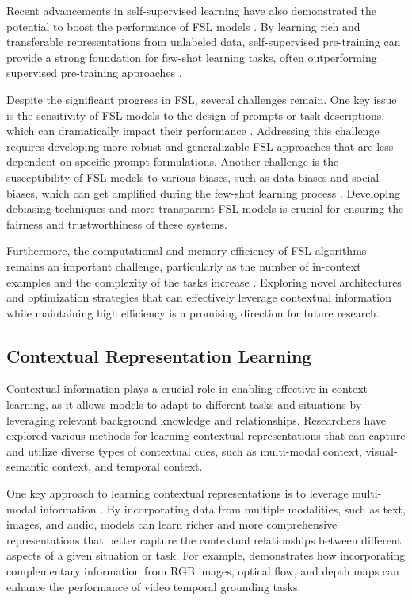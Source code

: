 \documentclass[11pt]{article}
\begin{document}
Recent advancements in self-supervised learning have also demonstrated the potential to boost the performance of FSL models \cite{ref117,ref118}. By learning rich and transferable representations from unlabeled data, self-supervised pre-training can provide a strong foundation for few-shot learning tasks, often outperforming supervised pre-training approaches \cite{ref119}.

Despite the significant progress in FSL, several challenges remain. One key issue is the sensitivity of FSL models to the design of prompts or task descriptions, which can dramatically impact their performance \cite{ref51}. Addressing this challenge requires developing more robust and generalizable FSL approaches that are less dependent on specific prompt formulations. Another challenge is the susceptibility of FSL models to various biases, such as data biases and social biases, which can get amplified during the few-shot learning process \cite{ref94}. Developing debiasing techniques and more transparent FSL models is crucial for ensuring the fairness and trustworthiness of these systems.

Furthermore, the computational and memory efficiency of FSL algorithms remains an important challenge, particularly as the number of in-context examples and the complexity of the tasks increase \cite{ref120}. Exploring novel architectures and optimization strategies that can effectively leverage contextual information while maintaining high efficiency is a promising direction for future research.

\subsection{Contextual Representation Learning}

Contextual information plays a crucial role in enabling effective in-context learning, as it allows models to adapt to different tasks and situations by leveraging relevant background knowledge and relationships. Researchers have explored various methods for learning contextual representations that can capture and utilize diverse types of contextual cues, such as multi-modal context, visual-semantic context, and temporal context.

One key approach to learning contextual representations is to leverage multi-modal information \cite{ref121,ref122,ref123}. By incorporating data from multiple modalities, such as text, images, and audio, models can learn richer and more comprehensive representations that better capture the contextual relationships between different aspects of a given situation or task. For example, \cite{ref124} demonstrates how incorporating complementary information from RGB images, optical flow, and depth maps can enhance the performance of video temporal grounding tasks.
\end{document}
